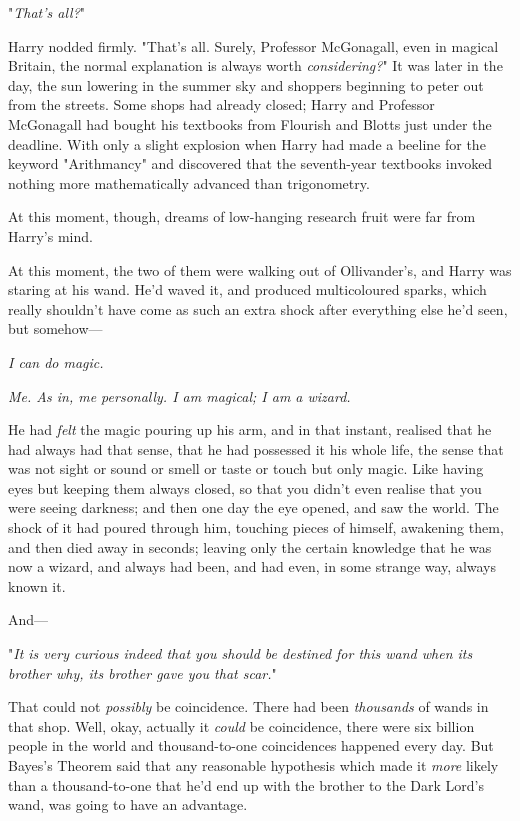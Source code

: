 "\emph{That's all?}"

Harry nodded firmly. "That's all. Surely, Professor McGonagall, even in magical
Britain, the normal explanation is always worth \emph{considering?}"
\later
It was later in the day, the sun lowering in the summer sky and shoppers
beginning to peter out from the streets. Some shops had already closed; Harry
and Professor McGonagall had bought his textbooks from Flourish and Blotts just
under the deadline. With only a slight explosion when Harry had made a beeline
for the keyword "Arithmancy" and discovered that the seventh-year textbooks
invoked nothing more mathematically advanced than trigonometry.

At this moment, though, dreams of low-hanging research fruit were far from
Harry's mind.

At this moment, the two of them were walking out of Ollivander's, and Harry was
staring at his wand. He'd waved it, and produced multicoloured sparks, which
really shouldn't have come as such an extra shock after everything else he'd
seen, but somehow---

\emph{I can do magic.}

\emph{Me. As in, me personally. I am magical; I am a wizard.}

He had \emph{felt} the magic pouring up his arm, and in that instant, realised
that he had always had that sense, that he had possessed it his whole life, the
sense that was not sight or sound or smell or taste or touch but only magic.
Like having eyes but keeping them always closed, so that you didn't even
realise that you were seeing darkness; and then one day the eye opened, and saw
the world. The shock of it had poured through him, touching pieces of himself,
awakening them, and then died away in seconds; leaving only the certain
knowledge that he was now a wizard, and always had been, and had even, in some
strange way, always known it.

And---

"\emph{It is very curious indeed that you should be destined for this wand when
its brother why, its brother gave you that scar.}"

That could not \emph{possibly} be coincidence. There had been \emph{thousands}
of wands in that shop. Well, okay, actually it \emph{could} be coincidence,
there were six billion people in the world and thousand-to-one coincidences
happened every day. But Bayes's Theorem said that any reasonable hypothesis
which made it \emph{more} likely than a thousand-to-one that he'd end up with
the brother to the Dark Lord's wand, was going to have an advantage.

